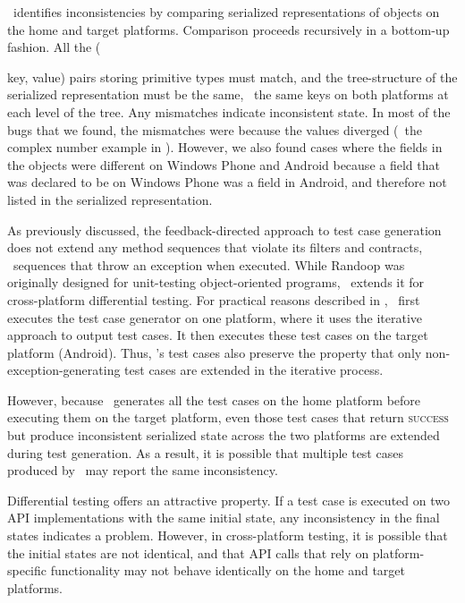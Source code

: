 \tool\ identifies inconsistencies by comparing serialized representations of
objects on the home and target platforms. Comparison proceeds recursively in a
bottom-up fashion. All the ({\textsf{key}, \textsf{value}) pairs storing
primitive types must match, and the tree-structure of the serialized
representation must be the same, \ie~the same \textsf{key}s on both platforms
at each level of the tree. Any mismatches indicate inconsistent state. In most
of the bugs that we found, the mismatches were because the \textsf{value}s
diverged (\eg~the complex number example in ).
However, we also found cases where the fields in the objects were different on
Windows Phone and Android because a field that was declared to be 
on Windows Phone was a  field in Android, and therefore not
listed in the serialized representation. 

As previously discussed, the feedback-directed approach to test case generation
does not extend any method sequences that violate its filters and contracts,
\eg~sequences that throw an exception when executed. While Randoop was
originally designed for unit-testing object-oriented programs, \tool\ extends
it for cross-platform differential testing. For practical reasons described in
, \tool\ first executes the test case generator
on one platform, where it uses the iterative approach to output test cases.  It
then executes these test cases on the target platform (Android). Thus, \tool's
test cases also preserve the property that only non-exception-generating test
cases are extended in the iterative process. 

However, because \tool\ generates all the test cases on the home platform
before executing them on the target platform, even those test cases that return
\textsc{success} but produce inconsistent serialized state across the two
platforms are extended during test generation. As a result, it is possible that
multiple test cases produced by \tool\ may report the same inconsistency.

%
Differential testing offers an attractive property. If a test case is executed
on two API implementations with the same initial state, any inconsistency in
the final states indicates a problem. However, in cross-platform testing, it is
possible that the initial states are not identical, and that API calls that
rely on platform-specific functionality may not behave identically on the home
and target platforms.

}

